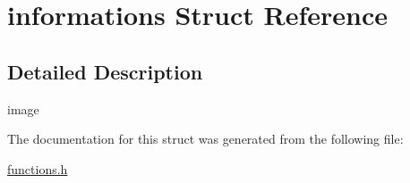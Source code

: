 \hypertarget{structinformations}{}\section{informations Struct Reference}
\label{structinformations}


\subsection{Detailed Description}
image 

The documentation for this struct was generated from the following file\+:\begin{DoxyCompactItemize}
\item 
\hyperlink{functions_8h}{functions.\+h}\end{DoxyCompactItemize}
